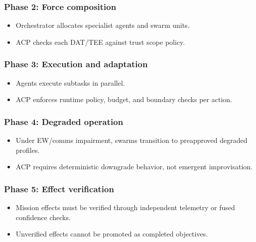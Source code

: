 \documentclass[
]{article}
\providecommand{\tightlist}{%
  \setlength{\itemsep}{0pt}\setlength{\parskip}{0pt}}
\begin{document}
\hypertarget{phase-2-force-composition}{%
\subsubsection{Phase 2: Force
composition}\label{phase-2-force-composition}}

\begin{itemize}
\tightlist
\item
  Orchestrator allocates specialist agents and swarm units.
\item
  ACP checks each DAT/TEE against trust scope policy.
\end{itemize}

\hypertarget{phase-3-execution-and-adaptation}{%
\subsubsection{Phase 3: Execution and
adaptation}\label{phase-3-execution-and-adaptation}}

\begin{itemize}
\tightlist
\item
  Agents execute subtasks in parallel.
\item
  ACP enforces runtime policy, budget, and boundary checks per action.
\end{itemize}

\hypertarget{phase-4-degraded-operation}{%
\subsubsection{Phase 4: Degraded
operation}\label{phase-4-degraded-operation}}

\begin{itemize}
\tightlist
\item
  Under EW/comms impairment, swarms transition to preapproved degraded
  profiles.
\item
  ACP requires deterministic downgrade behavior, not emergent
  improvisation.
\end{itemize}

\hypertarget{phase-5-effect-verification}{%
\subsubsection{Phase 5: Effect
verification}\label{phase-5-effect-verification}}

\begin{itemize}
\tightlist
\item
  Mission effects must be verified through independent telemetry or
  fused confidence checks.
\item
  Unverified effects cannot be promoted as completed objectives.
\end{itemize}
\end{document}
